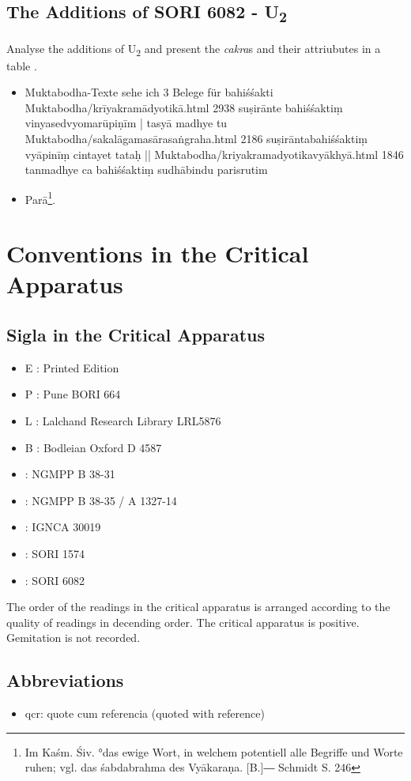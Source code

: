\section{The Additions of  SORI 6082 - U\textsubscript{2}}
\label{discussionu2}
Analyse the additions of U\textsubscript{2} and present the \textit{cakra}s and their attriubutes in a table .
\begin{itemize}
\item  Muktabodha-Texte sehe ich 3 Belege für bahiśśakti Muktabodha/krīyakramādyotikā.html 2938 suṣirānte bahiśśaktiṃ vinyasedvyomarūpiṇīm | tasyā madhye tu Muktabodha/sakalāgamasārasaṅgraha.html 2186 suṣirāntabahiśśaktiṃ vyāpinīṃ cintayet tataḥ || Muktabodha/kriyakramadyotikavyākhyā.html 1846 tanmadhye ca bahiśśaktiṃ sudhābindu parisrutim
  \item  Parā\footnote{Im Kaśm. Śiv. °das ewige Wort, in welchem potentiell alle Begriffe und Worte ruhen; vgl. das śabdabrahma des Vyākaraṇa. [B.]― Schmidt S. 246}.
  \end{itemize}

\chapter{Conventions in the Critical Apparatus}
\section{Sigla in the Critical Apparatus}

\begin{itemize}
\item E : Printed Edition
\item P : Pune BORI 664
\item L : Lalchand Research Library LRL5876
\item B : Bodleian Oxford D 4587
\item \None : NGMPP B 38-31
\item \Ntwo : NGMPP B 38-35 / A 1327-14
\item \Done : IGNCA 30019
\item \Uone : SORI 1574
\item \Utwo: SORI 6082
\end{itemize}

The order of the readings in the critical apparatus is arranged according to the quality of readings in decending order. The critical apparatus is positive. Gemitation is not recorded. 

\section{Abbreviations}
\begin{itemize}
  \item qcr: quote cum referencia (quoted with reference)
  \end{itemize}

